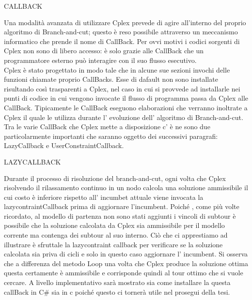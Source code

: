 \documentclass[11pt]{article}
\begin{document}
\vspace{2\baselineskip}
CALLBACK 
\vspace{2\baselineskip}

Una modalit\`a avanzata di utilizzare Cplex prevede di agire all'interno del proprio algoritmo di Branch-and-cut; questo \`e reso possibile attraverso un meccanismo informatico che prende il nome di CallBack. Per ovvi motivi i codici sorgenti di Cplex non sono di libero accesso: \`e solo grazie alle CallBack che un programmatore esterno pu\`o interagire con il suo flusso esecutivo.\\
Cplex \`e stato progettato in modo tale che in alcune sue sezioni invochi delle funzioni chiamate proprio CallBacks. Esse di dafault non sono installate risultando così trasparenti a Cplex, nel caso in cui si provvede ad installarle nei punti di codice in cui vengono invocate il flusso di programma passa da Cplex alle CallBack. Tipicamente le CallBack eseguono elaborazioni che verranno inoltrate a Cplex il quale le utilizza durante l' evoluzione dell' algoritmo di Branch-and-cut.
Tra le varie CallBack che Cplex mette a disposizione c' \`e  ne sono due particolarmente importanti che saranno oggetto dei successivi paragrafi: LazyCallback e UserConstraintCallback.

\vspace{2\baselineskip}
LAZYCALLBACK
\vspace{2\baselineskip}

Durante il processo di risoluzione del branch-and-cut, ogni volta che Cplex risolvendo il rilassamento continuo in un nodo calcola una soluzione ammissibile il cui costo \`e  inferiore rispetto all' incumbet attuale viene invocata la lazycontraintCallback prima di aggiornare l'incumbent. Poiché , come pi\`u volte ricordato, al modello di partenza non sono stati aggiunti i vincoli di subtour \`e possibile che la soluzione calcolata da Cplex sia ammissibile per il modello corrente ma contenga dei subtour al suo interno. Ciò che ci apprestiamo ad illustrare è sfruttale la lazycontraint callback per verificare se la soluzione calcolata sia priva di cicli e solo in questo caso aggiornare l' incumbent.
Si osserva che a differenza del metodo Loop una volta che Cplex produce la soluzione ottima questa certamente \`e  ammissibile e corrisponde quindi al tour ottimo che si vuole cercare.  
A livello implementativo sarà mostrato sia come installare la questa callBack in C\# sia in c poiché questo ci tornerà utile nel prosegui della tesi.
\end{document}
